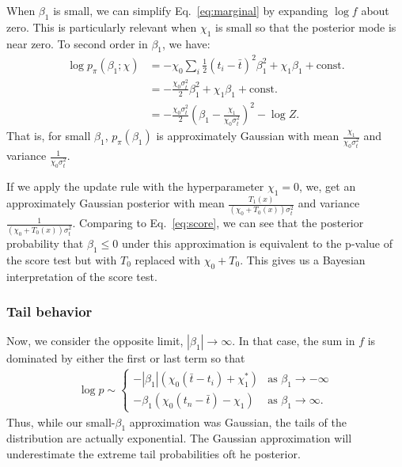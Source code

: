 \documentclass[12pt, letterpaper]{article}
\begin{document}
When $\beta_1$ is small, we can simplify Eq.~\ref{eq:marginal} by expanding $\log f$ about zero.
This is particularly relevant when $\chi_1$ is small so that the posterior mode is near zero.
To second order in $\beta_1$, we have:
\begin{align}
    \log p_\pi(\beta_1; \chi) & = -\chi_0 \sum_i \frac{1}{2} {(t_i - \bar{t})}^2 \beta_1^2 + \chi_1 \beta_1 + \text{const.} \\
                              & = -\frac{\chi_0 \sigma_t^2}{2} \beta_1^2 + \chi_1 \beta_1 + \text{const.} \\
                              & = -\frac{\chi_0 \sigma_t^2}{2} {(\beta_1 - \frac{\chi_1}{\chi_0 \sigma_t^2})}^2 - \log Z.
\end{align}
That is, for small $\beta_1$, $p_\pi(\beta_1)$ is approximately Gaussian with mean $\frac{\chi_1}{\chi_0 \sigma_t^2}$ and variance $\frac{1}{\chi_0 \sigma_t^2}$.

If we apply the update rule with the hyperparameter $\chi_1 = 0$, we, get an approximately Gaussian posterior with mean $\frac{T_1(x)}{(\chi_0 + T_0(x)) \sigma_t^2}$ and variance $\frac{1}{(\chi_0 + T_0(x)) \sigma_t^2}$.
Comparing to Eq.~\ref{eq:score}, we can see that the posterior probability that $\beta_1 \leq 0$ under this approximation is equivalent to the p-value of the score test but with $T_0$ replaced with $\chi_0 + T_0$.
This gives us a Bayesian interpretation of the score test.

\subsubsection{Tail behavior}

Now, we consider the opposite limit, $| \beta_1 | \to \infty$.
In that case, the sum in $f$ is dominated by either the first or last term so that
\begin{align}
    \log p \sim
        \begin{cases}
            - |\beta_1| (\chi_0(\bar{t} - t_i) + \chi_1^*) & \text{as } \beta_1 \to -\infty \\
            - \beta_1 (\chi_0(t_n - \bar{t}) - \chi_1) & \text{as } \beta_1 \to \infty.
        \end{cases}
        \label{eq:tails}
\end{align}
Thus, while our small-$\beta_1$ approximation was Gaussian, the tails of the distribution are actually exponential.
The Gaussian approximation will underestimate the extreme tail probabilities oft he posterior.
\end{document}
